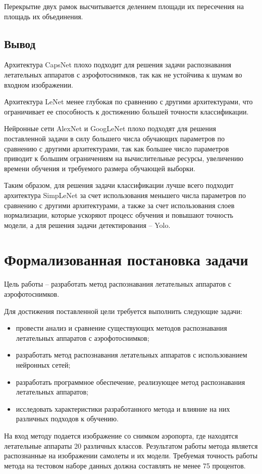 Перекрытие двух рамок высчитывается делением площади их пересечения на площадь их объединения.


\subsection{Вывод}
Архитектура CapsNet плохо подходит для решения задачи распознавания летательных аппаратов с аэрофотоснимков, так как не устойчива к шумам во входном изображении.

Архитектура LeNet менее глубокая по сравнению с другими архитектурами, что ограничивает ее способность к достижению большей точности классификации.

Нейронные сети AlexNet и GoogLeNet плохо подходят для решения поставленной задачи в силу большего числа обучающих параметров по сравнению с другими архитектурами, так как большее число параметров приводит к большим ограничениям на вычислительные ресурсы, увеличению времени обучения и требуемого размера обучающей выборки.

Таким образом, для решения задачи классификации лучше всего подходит архитектура SimpLeNet за счет использования меньшего числа параметров по сравнению с другими архитектурами, а также за счет использования слоев нормализации, которые ускоряют процесс обучения и повышают точность модели, а для решения задачи детектирования -- Yolo.

\section{Формализованная постановка задачи}
Цель работы -- разработать метод распознавания летательных аппаратов с аэрофотоснимков.

Для достижения поставленной цели требуется выполнить следующие задачи:
\begin{itemize}
	\item провести анализ и сравнение существующих методов распознавания летательных аппаратов с аэрофотоснимков;
	\item разработать метод распознавания летательных аппаратов с использованием нейронных сетей;
	\item разработать программное обеспечение, реализующее метод распознавания летательных аппаратов;
	\item исследовать характеристики разработанного метода и влияние на них различных подходов к обучению.
\end{itemize}

На вход методу подается изображение со снимком аэропорта, где находятся летательные аппараты 20 различных классов. Результатом работы метода является распознанные на изображении самолеты и их модели. Требуемая точность работы метода на тестовом наборе данных должна составлять не менее 75 процентов.

